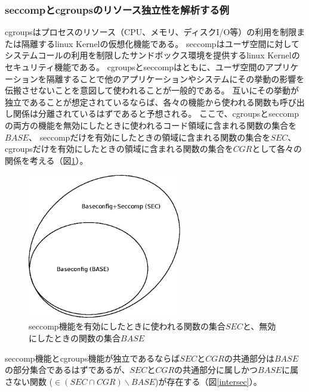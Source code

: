 \subsubsection{\acrshort{seccomp}と\acrshort{cgroups}のリソース独立性を解析する例}
\gls{cgroups}はプロセスのリソース（CPU、メモリ、ディスクI/O等）の利用を制限または隔離する\acrshort{linux} Kernelの仮想化機能である。
\gls{seccomp}はユーザ空間に対してシステムコールの利用を制限したサンドボックス環境を提供する\acrshort{linux} Kernelのセキュリティ機能である。
\acrshort{cgroups}と\acrshort{seccomp}はともに、ユーザ空間のアプリケーションを隔離することで他のアプリケーションやシステムにその挙動の影響を伝搬させないことを意図して使われることが一般的である。
互いにその挙動が独立であることが想定されているならば、各々の機能から使われる関数も呼び出し関係は分離されているはずであると予想される。
ここで、\acrshort{cgroups}と\acrshort{seccomp}の両方の機能を無効にしたときに使われるコード領域に含まれる関数の集合を$BASE$、
\acrshort{seccomp}だけを有効にしたときの領域に含まれる関数の集合を$SEC$、
\acrshort{cgroups}だけを有効にしたときの領域に含まれる関数の集合を$CGR$として各々の関係を考える（図\ref{bs}）。
\begin{figure}[ht]
  \centering
  \includegraphics[width=0.6\textwidth]{pic/bs.eps}
  \caption{\acrshort{seccomp}機能を有効にしたときに使われる関数の集合$SEC$と、無効にしたときの関数の集合$BASE$}
  \label{bs}
\end{figure}
\par
\acrshort{seccomp}機能と\acrshort{cgroups}機能が独立であるならば$SEC$と$CGR$の共通部分は$BASE$の部分集合であるはずであるが、$SEC$と$CGR$の共通部分に属しかつ$BASE$に属さない関数
($ \in (SEC \cap CGR) \smallsetminus BASE$)が存在する（図\ref{intersec}）。
